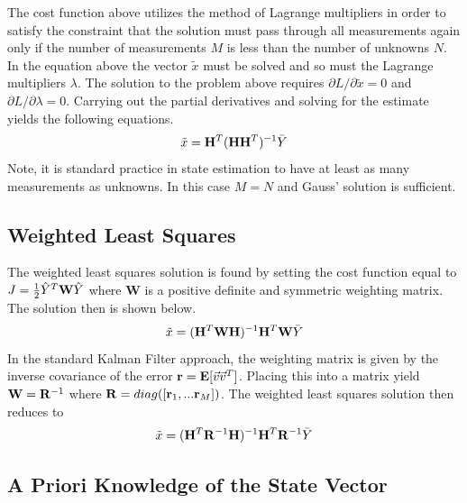 \documentclass{article}
\begin{document}
The cost function above utilizes the method of Lagrange multipliers in
order to satisfy the constraint that the solution must pass through
all measurements again only if the number of measurements $M$ is less than
the number of unknowns $N$. In the equation above the vector
$\tilde{x}$ must be solved and so must the Lagrange multipliers
$\lambda$. The solution to the problem above requires
$\partial L / \partial \tilde{x} = 0$ and $\partial L / \partial \lambda = 0$. Carrying out the partial derivatives and solving for the estimate
yields the following equations. 
\begin{equation}
  \tilde{x} = {\bf H}^T({\bf H}{\bf H}^T)^{-1}\bar{Y}
\end{equation}
Note, it is standard practice in state estimation to have at least as
many measurements as unknowns. In this case $M=N$ and Gauss' solution
is sufficient. 

\subsection{Weighted Least Squares}

The weighted least squares solution is found by setting the cost
function equal to $J = \frac{1}{2}\hat{Y}^T{\bf W}\hat{Y}$
where {\bf W} is a positive definite and symmetric weighting matrix. The solution then is
shown below.
\begin{equation}\label{e:weights}
  \tilde{x} = ({\bf H}^T{\bf W}{\bf H})^{-1}{\bf H}^T{\bf W}\bar{Y}
\end{equation}
In the standard Kalman Filter approach, the weighting matrix is given
by the inverse covariance of the error ${\bf r} = {\bf
  E}[\vec{v}\vec{v}^T]$. Placing this into a matrix yield ${\bf W} =
{\bf R}^{-1}$ where ${\bf R} = diag([{\bf r}_1,...{\bf r}_M])$.  
The weighted least squares solution then reduces to
\begin{equation}
  \tilde{x} = ({\bf H}^T{\bf R}^{-1}{\bf H})^{-1}{\bf H}^T{\bf R}^{-1}\bar{Y}
\end{equation}

\subsection{A Priori Knowledge of the State Vector}
\end{document}
